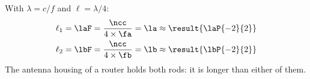 With $\lambda = c/f$ and $\ell = \lambda/4$:
\begin{align}
 \ell_1 &= \laF = \frac{\ncc}{4\times\fa} = \la \approx \result{\laP{-2}{2}} \\
 \ell_2 &= \lbF = \frac{\ncc}{4\times\fb} = \lb \approx \result{\lbP{-2}{2}}
\end{align}
The antenna housing of a router holds both rods: it is longer than either of them.
